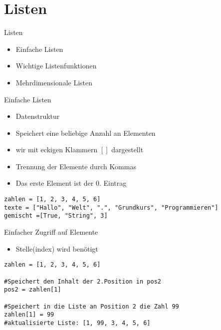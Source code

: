 \section{Listen}

\begin{frame}[fragile]{Listen}
\begin{itemize}
	\item Einfache Listen
	\item Wichtige Listenfunktionen
	\item Mehrdimensionale Listen
\end{itemize}
\end{frame}

\begin{frame}[fragile]{Einfache Listen}
	\begin{itemize}
		\item Datenstruktur
		\item Speichert eine beliebige Anzahl an Elementen
		\item wir mit eckigen Klammern $[ ]$ dargestellt
		\item Trennung der Elemente durch Kommas
		\item Das erste Element ist der 0. Eintrag 
		
	\end{itemize}
\begin{lstlisting}
zahlen = [1, 2, 3, 4, 5, 6]
texte = ["Hallo", "Welt", ".", "Grundkurs", "Programmieren"]
gemischt =[True, "String", 3]
\end{lstlisting}
\end{frame}

\begin{frame}[fragile]{Einfacher Zugriff auf Elemente}
\begin{itemize}
	\item Stelle(index) wird benötigt	
\end{itemize}
\begin{lstlisting}
zahlen = [1, 2, 3, 4, 5, 6]

#Speichert den Inhalt der 2.Position in pos2
pos2 = zahlen[1]

#Speichert in die Liste an Position 2 die Zahl 99
zahlen[1] = 99
#aktualisierte Liste: [1, 99, 3, 4, 5, 6]
\end{lstlisting}
\end{frame}

